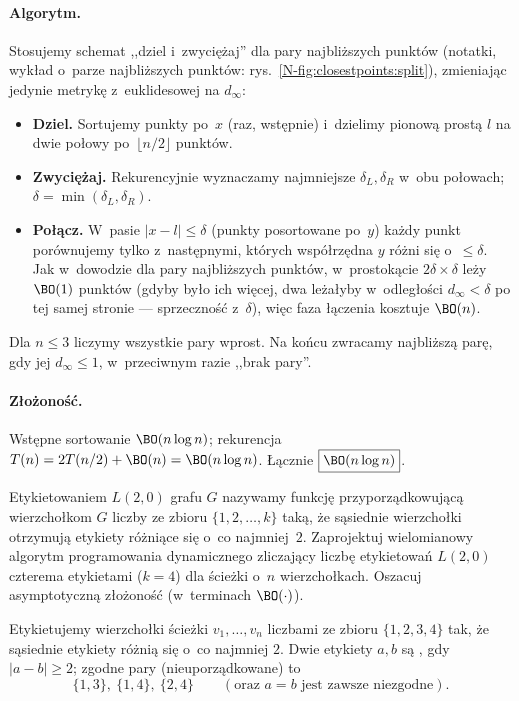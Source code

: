 \paragraph{Algorytm.}
Stosujemy schemat ,,dziel i~zwyciężaj'' dla pary najbliższych punktów
(notatki, wykład o~parze najbliższych punktów: rys.~\ref{N-fig:closestpoints:split}),
zmieniając jedynie metrykę z~euklidesowej na $d_\infty$:
\begin{itemize}[nosep]
	\item \textbf{Dziel.} Sortujemy punkty po~$x$ (raz, wstępnie) i~dzielimy
	      pionową prostą $l$ na dwie połowy po~$\lfloor n/2\rfloor$ punktów.
	\item \textbf{Zwyciężaj.} Rekurencyjnie wyznaczamy najmniejsze
	      $\delta_L,\delta_R$ w~obu połowach; $\delta=\min(\delta_L,\delta_R)$.
	\item \textbf{Połącz.} W~pasie $|x-l|\leq\delta$ (punkty posortowane po~$y$)
	      każdy punkt porównujemy tylko z~następnymi, których współrzędna $y$
	      różni się o~$\leq\delta$. Jak w~dowodzie dla pary najbliższych punktów,
	      w~prostokącie $2\delta\times\delta$ leży $\BO(1)$ punktów (gdyby było
	      ich więcej, dwa leżałyby w~odległości $d_\infty<\delta$ po tej samej
	      stronie --- sprzeczność z~$\delta$), więc faza łączenia kosztuje
	      $\BO(n)$.
\end{itemize}
Dla $n\leq 3$ liczymy wszystkie pary wprost. Na końcu zwracamy najbliższą parę,
gdy jej $d_\infty\leq 1$, w~przeciwnym razie ,,brak pary''.

\paragraph{Złożoność.}
Wstępne sortowanie $\BO(n\log n)$; rekurencja $T(n)=2T(n/2)+\BO(n)=\BO(n\log n)$.
Łącznie $\boxed{\BO(n\log n)}$.

\clearpage
\begin{zadanie}
	Etykietowaniem $L(2,0)$ grafu $G$ nazywamy funkcję przyporządkowującą
	wierzchołkom $G$ liczby ze zbioru $\{1,2,\dots,k\}$ taką, że sąsiednie
	wierzchołki otrzymują etykiety różniące się o~co najmniej~$2$. Zaprojektuj
	wielomianowy algorytm programowania dynamicznego zliczający liczbę
	etykietowań $L(2,0)$ czterema etykietami ($k=4$) dla ścieżki o~$n$
	wierzchołkach. Oszacuj asymptotyczną złożoność (w~terminach $\BO(\cdot)$).
\end{zadanie}

Etykietujemy wierzchołki ścieżki $v_1,\dots,v_n$ liczbami ze zbioru
$\{1,2,3,4\}$ tak, że sąsiednie etykiety różnią się o~co najmniej $2$.
Dwie etykiety $a,b$ są , gdy $|a-b|\geq 2$; zgodne pary
(nieuporządkowane) to
\[
	\{1,3\},\ \{1,4\},\ \{2,4\}\qquad(\text{oraz }a=b\text{ jest zawsze niezgodne}).
\]

